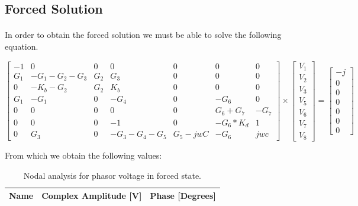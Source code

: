 \subsection{Forced Solution}

\paragraph{} In order to obtain the forced solution we must be able to solve the following equation.  

\begin{equation}
\begin{bmatrix}
	-1	&	0	&	0	&	0	&	0	&	0	&	0 \\
	G_1	&	-G_1 - G_2 - G_3	&	G_2	&	G_3	&	0	&	0	&	0 \\
	0	&	-K_b - G_2	&	G_2	&	K_b	&	0	&	0	&	0 \\
	G_1	&	-G_1	&	0	&	-G_4	&	0	&	-G_6	&	0 \\
	0	&	0	&	0	&	0	&	0	&	G_6 + G_7	&	-G_7 \\
	0	&	0	&	0	&	-1	&	0	&	-G_6 *	K_d	&	1 \\
	0	&	G_3	&	0	&	-G_3 - G_4 - G_5	&	G_5 - jwC	&	-G_6	&	jwc
\end{bmatrix}
\times
\begin{bmatrix}
	V_1 \\
	V_2 \\
	V_3 \\
	V_5 \\
	V_6 \\
	V_7 \\
	V_8
\end{bmatrix}
=
\begin{bmatrix}
	-j \\
	0 \\
	0 \\
	0 \\
	0 \\
	0 \\
	0
	\label{m:1}
\end{bmatrix}
\end{equation}

From which we obtain the following values:

\begin{table}[h]
  \centering
  \begin{tabular}{|l|r|r|}
    \hline    
    {\bf Name} & {\bf Complex Amplitude [V]} & {\bf Phase [Degrees]}\\ \hline
     
  \end{tabular}
  \caption{Nodal analysis for phasor voltage in forced state.}
  \label{tab:phasor}
\end{table}

